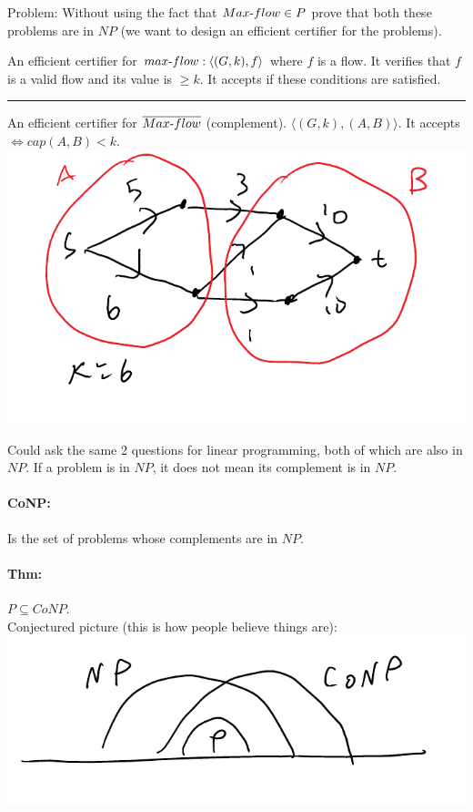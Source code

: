\documentclass[12 pt]{article}
\begin{document}
          Problem: Without using the fact that $Max\hbox{-}flow \in P$
          prove that both these problems are in $NP$ (we want to
          design an efficient certifier for the problems).

          An efficient certifier for $max\hbox{-}flow: \langle (G,k),
          f \rangle$ where $f$ is a flow. It verifies that $f$ is a
          valid flow and its value is $\geq k$. It accepts if these
          conditions are satisfied.
          \\ \noindent \rule{\textwidth}{0.5pt}
          An efficient certifier for $\overline{Max\hbox{-}flow}$
          (complement). $\langle (G,k), (A,B) \rangle$. It accepts
          $\iff cap(A,B) < k$.
          \\ \includegraphics[width=.9\textwidth]{i117.pdf}

          Could ask the same 2 questions for linear programming, both
          of which are also in $NP$. If a problem is in $NP$, it does
          not mean its complement is in $NP$.

          \paragraph{CoNP:} Is the set of problems whose complements
          are in $NP$.
          \paragraph{Thm:} $P \subseteq CoNP$.
          \\ Conjectured picture (this is how people believe things are):
          \\ \includegraphics[width=.9\textwidth]{i118.pdf}
\end{document}
